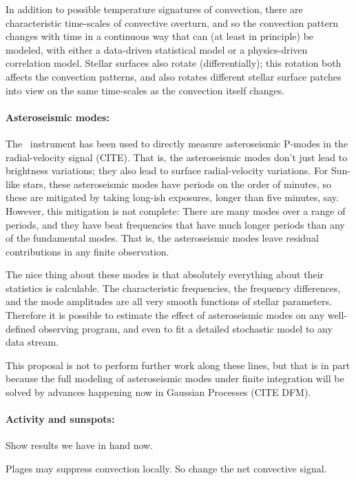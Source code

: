 \documentclass[12pt, fullpage, letterpaper]{article}
\begin{document}
In addition to possible temperature signatures of convection, there
are characteristic time-scales of convective overturn, and so the convection
pattern changes with time in a continuous way that can (at least in principle)
be modeled, with either a data-driven statistical model or a physics-driven
correlation model.
Stellar surfaces also rotate (differentially); this rotation both affects
the convection patterns, and also rotates different stellar surface patches
into view on the same time-scales as the convection itself changes.

\paragraph{Asteroseismic modes:}
The \HARPS\ instrument has been used to directly measure asteroseismic
P-modes in the radial-velocity signal (CITE).
That is, the asteroseismic modes don't
just lead to brightness variations; they also lead to surface radial-velocity
variations.
For Sun-like stars, these asteroseismic modes have periods on the order of minutes,
so these are mitigated by taking long-ish exposures, longer than five minutes, say.
However, this mitigation is not complete: There are many modes over a range of periods,
and they have beat frequencies that have much longer periods than any of the fundamental
modes.
That is, the asteroseismic modes leave residual contributions in any finite observation.

The nice thing about these modes is that absolutely everything about their statistics
is calculable.
The characteristic frequencies, the frequency differences, and the mode amplitudes are
all very smooth functions of stellar parameters.
Therefore it is possible to estimate the effect of asteroseismic modes on any well-defined
observing program, and even to fit a detailed stochastic model to any data stream.

This proposal is not to perform further work along these lines, but that is in part because
the full modeling of asteroseismic modes under finite integration will be solved
by advances happening now in Gaussian Processes (CITE DFM).

\paragraph{Activity and sunspots:}
Show results we have in hand now.

Plages may suppress convection locally. So change the net convective signal.
\end{document}
